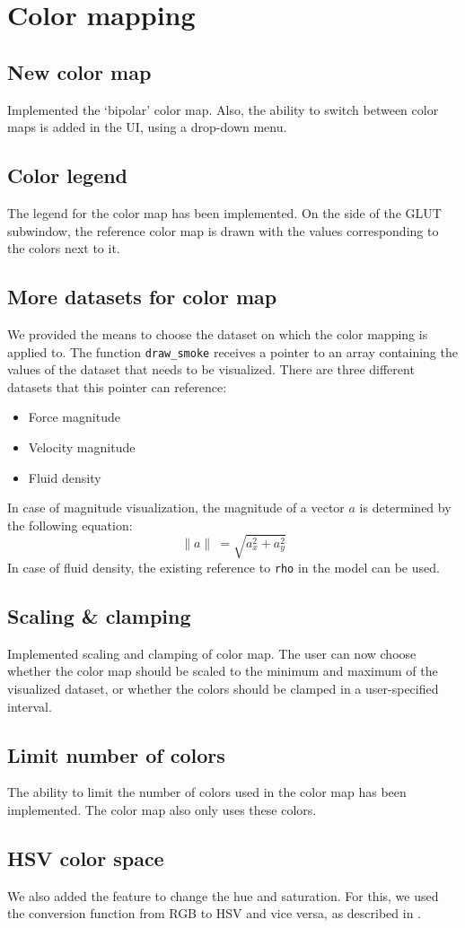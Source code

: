 \section{Color mapping}
	\label{sec:color_mapping}
	\subsection*{New color map}
		Implemented the `bipolar' color map.
		Also, the ability to switch between color maps is added in the UI, using a drop-down menu.
	\subsection*{Color legend}
		The legend for the color map has been implemented.
		On the side of the GLUT subwindow, the reference color map is drawn with the values corresponding to the colors next to it.
	\subsection*{More datasets for color map}
		We provided the means to choose the dataset on which the color mapping is applied to.
		The function \texttt{draw\_smoke} receives a pointer to an array containing the values of the dataset that needs to be visualized.
		There are three different datasets that this pointer can reference:
		\begin{itemize}
			\item Force magnitude
			\item Velocity magnitude
			\item Fluid density
		\end{itemize}
		In case of magnitude visualization, the magnitude of a vector \(a\) is determined by the following equation:
		\[\| a \|\ = \sqrt{a_x^2 + a_y^2}\]
		In case of fluid density, the existing reference to \texttt{rho} in the model can be used.
	\subsection*{Scaling \& clamping}
		Implemented scaling and clamping of color map.
		The user can now choose whether the color map should be scaled to the minimum and maximum of the visualized dataset, or whether the colors should be clamped in a user-specified interval.
	\subsection*{Limit number of colors}
		The ability to limit the number of colors used in the color map has been implemented.
		The color map also only uses these colors.
	\subsection*{HSV color space}
		We also added the feature to change the hue and saturation.
		For this, we used the conversion function from RGB to HSV and vice versa, as described in \cite{telea2014data}.